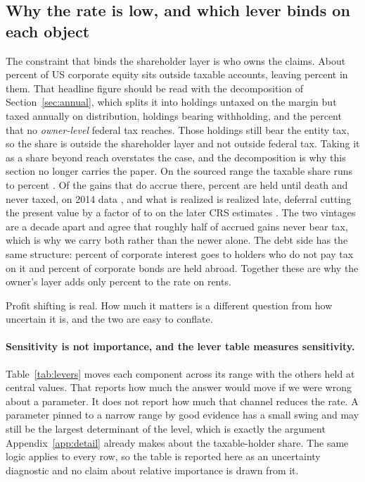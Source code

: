 \subsection{Why the rate is low, and which lever binds on each object}
\label{sec:levers}

The constraint that binds the shareholder layer is who owns the claims. About  percent
of US corporate equity sits outside taxable accounts, leaving  percent in them.
That headline figure should be read with the decomposition of
Section~\ref{sec:annual}, which splits it into holdings untaxed on the margin but taxed
annually on distribution, holdings bearing withholding, and the  percent that no
\emph{owner-level} federal tax reaches. Those holdings still bear the entity tax, so the share is
outside the shareholder layer and not outside federal tax. Taking it as a share beyond reach overstates the case, and the
decomposition is why this section no longer carries the paper. On the sourced range the taxable
share runs  to  percent
\citep{RosenthalAustin2016,RosenthalBurke2020,RosenthalMucciolo2024}. Of the gains that do accrue
there,  percent are held until death and never taxed, on 2014 data
\citep{CBO2014}, and what is realized is realized late, deferral cutting the present value by a
factor of  to  on the later CRS estimates
\citep{Gravelle2022}. The two vintages are a decade apart and agree that roughly half of accrued
gains never bear tax, which is why we carry both rather than the newer alone. The debt side has the same
structure:  percent of corporate interest goes to holders who do not pay
tax on it and  percent of corporate bonds are held abroad. Together these
are why the owner's layer adds only  percent to the rate on rents.

Profit shifting is real. How much it matters is a different question from how uncertain it is,
and the two are easy to conflate.

\paragraph{Sensitivity is not importance, and the lever table measures sensitivity.}
Table~\ref{tab:levers} moves each component across its range with the others held at central
values. That reports how much the answer would move if we were wrong about a parameter. It does
not report how much that channel reduces the rate. A parameter pinned to a narrow range by good
evidence has a small swing and may still be the largest determinant of the level, which is
exactly the argument Appendix~\ref{app:detail} already makes about the taxable-holder share. The
same logic applies to every row, so the table is reported here as an uncertainty diagnostic and
no claim about relative importance is drawn from it.

